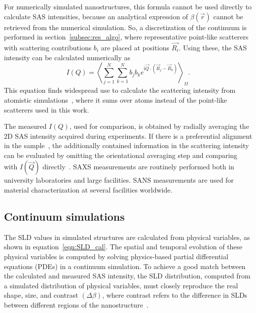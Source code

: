 \documentclass[preprint, 5p, times, twocolumn]{elsarticle}
\begin{document}
For numerically simulated nanostructures, this formula cannot be used directly to calculate SAS intensities, because an analytical expression of $\beta(\vec{r})$ cannot be retrieved from the numerical simulation. So, a discretization of the continuum is performed in section~\ref{subsec:res_algo}, where representative point-like scatterers with scattering contributions $b_i$ are placed at positions $\vec{R_i}$. Using these, the SAS intensity can be calculated numerically as
%
\begin{equation}
    \label{eqn:SANS_atomic}
    I(Q)=\left\langle\sum_{j=1}^{N}\sum_{k=1}^{N} b_j b_k e^{\mathrm{i} \vec{Q} \cdot (\vec{R}_j -\vec{R}_k)}\right\rangle_{\Omega}.
\end{equation}
%
This equation finds widespread use to calculate the scattering intensity from atomistic simulations~\cite{majumdar2024computation}, where it sums over atoms instead of the point-like scatterers used in this work.

The measured $I(Q)$, used for comparison, is obtained by radially averaging the 2D SAS intensity acquired during experiments. If there is a preferential alignment in the sample~\cite{mcmullan2010directed, cerclier2012structure}, the additionally contained information in the scattering intensity can be evaluated by omitting the orientational averaging step and comparing with $I(\vec{Q})$ directly~\cite{hollamby2008effect}. SAXS measurements are routinely performed both in university laboratories and large facilities. SANS measurements are used for material characterization at several facilities worldwide.

\subsection{Continuum simulations}
\label{subsec:mat_method_sim}

The SLD values in simulated structures are calculated from physical variables, as shown in equation~\ref{eqn:SLD_cal}. The spatial and temporal evolution of these physical variables is computed by solving physics-based partial differential equations (PDEs) in a continuum simulation. To achieve a good match between the calculated and measured SAS intensity, the SLD distribution, computed from a simulated distribution of physical variables, must closely reproduce the real shape, size, and contrast $(\Delta \beta)$, where contrast refers to the difference in SLDs between different regions of the nanostructure~\cite{hollamby2013practical, sivia2011elementary}.
\end{document}
